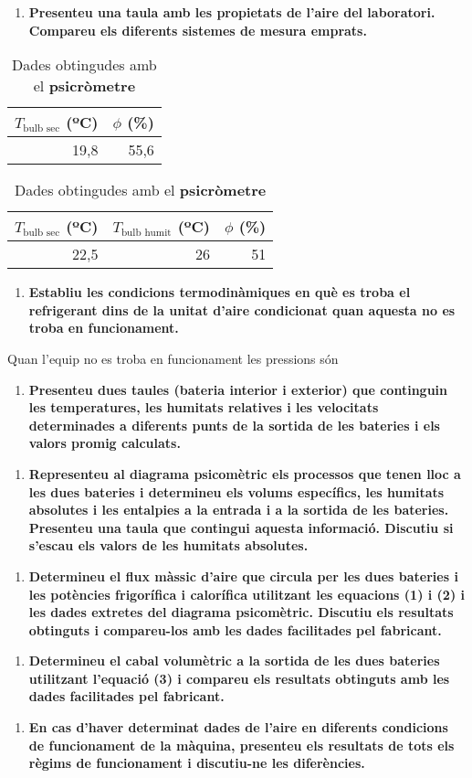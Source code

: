 \documentclass[a4paper]{article}
\newenvironment{questionenum}{%
	\setlist[enumerate]{resume}
	\restartlist{enumerate}
	\newcommand{\question}[1]{
		\begin{enumerate}
			\item\bfseries ##1
		\end{enumerate}
}}{%
}
\begin{document}
\begin{questionenum}
	\question{Presenteu una taula amb les propietats de l'aire del laboratori. Compareu els diferents sistemes de mesura emprats.}
	
	\begin{table}[H]
		\centering
		\begin{minipage}[t]{0.48\textwidth}
			\centering
			\begin{tabular}{rr}
				$T_{\text{bulb sec}}$ (ºC) & $\phi$ (\%) \\
				\hline
				19,8 & 55,6 
			\end{tabular}
			\caption{Dades obtingudes amb l'\textbf{higròmetre}}
		\end{minipage}
		\hfill
		\begin{minipage}[t]{0.48\textwidth}
			\centering
			\begin{tabular}{rrr}
				$T_{\text{bulb sec}}$ (ºC) & $T_{\text{bulb humit}}$ (ºC) & $\phi$ (\%) \\
				\hline
				22,5 & 26 & 51
			\end{tabular}
			\caption{Dades obtingudes amb el \textbf{psicròmetre}}
		\end{minipage}
	\end{table}
	
	\question{Establiu les condicions termodinàmiques en què es troba el refrigerant dins de la unitat d'aire condicionat quan aquesta no es troba en funcionament.}
	
	Quan l'equip no es troba en funcionament les pressions són 
	
	\question{Presenteu dues taules (bateria interior i exterior) que continguin les temperatures, les humitats relatives i les velocitats determinades a diferents punts de la sortida de les bateries i els valors promig calculats.}
	
	\begin{table}[H]
		\centering
		\caption{Dades de la bateria interior}
	\end{table}

	\question{Representeu al diagrama psicomètric els processos que tenen lloc a les dues bateries i determineu els volums específics, les humitats absolutes i les entalpies a la entrada i a la sortida de les bateries. Presenteu una taula que contingui aquesta informació. Discutiu si s'escau els valors de les humitats absolutes.}
	
	\question{Determineu el flux màssic d'aire que circula per les dues bateries i les potències frigorífica i calorífica utilitzant les equacions (1) i (2) i les dades extretes del diagrama psicomètric. Discutiu els resultats obtinguts i compareu-los amb les dades facilitades pel fabricant.}
	
	\question{Determineu el cabal volumètric a la sortida de les dues bateries utilitzant l'equació (3) i compareu els resultats obtinguts amb les dades facilitades pel fabricant.}
	
	\question{En cas d'haver determinat dades de l'aire en diferents condicions de funcionament de la màquina, presenteu els resultats de tots els règims de funcionament i discutiu-ne les diferències.}
\end{questionenum}
\end{document}
